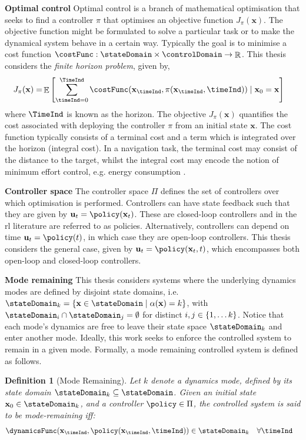 \documentclass{mimosis-class/mimosis}
\newtheorem{definition}{Definition}[section]
\numberwithin{equation}{chapter}
\DeclareMathOperator{\R}{\mathbb{R}}
\DeclareMathOperator{\E}{\mathbb{E}}
\newcommand{\modeInd}{\ensuremath{k}}
\newcommand{\ModeInd}{\ensuremath{\MakeUppercase{\modeInd}}}
\newcommand{\mode}[1]{\ensuremath{#1_{\modeInd}}}
\newcommand{\state}{\ensuremath{\mathbf{x}}}
\newcommand{\control}{\ensuremath{\mathbf{u}}}
\newcommand{\x}{\ensuremath{\mathbf{x}}}
\newcommand{\modeVar}{\ensuremath{\alpha}}
\begin{document}
\textbf{Optimal control}
Optimal control is a branch of mathematical optimisation that seeks to find a controller \(\pi\) that
optimises an objective function \(J_{\pi}(\x)\).
The objective function might be formulated to solve a particular task or to make the dynamical
system behave in a certain way.
Typically the goal is to minimise a cost function \(\costFunc : \stateDomain \times \controlDomain \rightarrow \R\).
This thesis considers the \emph{finite horizon problem}, given by,
\begin{align} \label{eq-optimal-control-objective}
J_{\pi}(\state) = &\E \left[ \sum_{\timeInd=0}^{\TimeInd} \costFunc(\state_{\timeInd}, \pi(\state_{\timeInd}, \timeInd))
\mid \state_0=\state \right]
\end{align}
where \(\TimeInd\) is known as the horizon.
The objective \(J_{\pi}(\state)\) quantifies the cost associated with deploying the controller \(\pi\) from
an initial state \(\state\).
The cost function typically consists of a terminal cost and a term which is integrated over the horizon (integral cost).
In a navigation task, the terminal cost may consist of the distance to the target, whilst the integral cost
may encode the notion of minimum effort control, e.g. energy consumption \citep{kirkOptimal2004}.

\textbf{Controller space}
The controller space \(\Pi\) defines the set of controllers over which optimisation is performed.
Controllers can have state feedback such that they are given by \(\control_t = \policy(\state_t)\).
These are closed-loop controllers and  in the \acrshort{rl} literature are referred to as policies.
Alternatively, controllers can depend on time \(\control_t = \policy(t)\), in which case they are open-loop controllers.
This thesis considers the general case, given by \(\control_t = \policy(\state_t, t)\),
which encompasses both open-loop and closed-loop controllers.

\textbf{Mode remaining}
This thesis considers systems where the underlying dynamics modes are defined by disjoint state domains, i.e.
\(\mode{\stateDomain} = \{ \state \in \stateDomain \mid \modeVar(\state) = \modeInd \}\), with
\(\stateDomain_{i} \cap \stateDomain_{j} = \emptyset\) for distinct \(i, j \in \{1, \ldots \ModeInd\}\).
Notice that each mode's dynamics are free to leave their state space \(\mode{\stateDomain}\)
and enter another mode.
Ideally, this work seeks to enforce the controlled system to remain in a given mode.
Formally, a mode remaining controlled system is defined as follows.
\begin{definition}[Mode Remaining] \label{def-mode-remaining-main}
Let $\modeInd$ denote a dynamics mode, defined by its state domain $\mode{\stateDomain} \subseteq \stateDomain$.
Given an initial state $\state_0 \in \mode{\stateDomain}$, and a controller $\policy \in \Pi$,
the controlled system is said to be mode-remaining iff:
\begin{align} \label{eq-mode-remaining-def-main}
\dynamicsFunc(\state_{\timeInd}, \policy(\state_{\timeInd}, \timeInd))
&\in \mode{\stateDomain} \quad \forall \timeInd
\end{align}
\end{definition}
\end{document}
